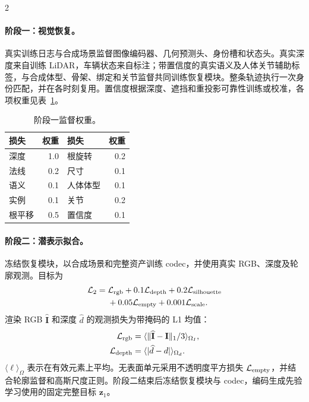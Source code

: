 \begin{multicols}{2}

\paragraph{阶段一：视觉恢复。}
真实训练日志与合成场景监督图像编码器、几何预测头、身份槽和状态头。真实深度来自训练 LiDAR，车辆状态来自标注；带置信度的真实语义及人体关节辅助标签，与合成体型、骨架、绑定和关节监督共同训练恢复模块。整条轨迹执行一次身份匹配，并在各时刻复用。置信度根据深度、遮挡和重投影可靠性训练或校准，各项权重见表~\ref{tab:recovery-weights}。

\begin{table}[H]
\centering\small
\caption{阶段一监督权重。}
\label{tab:recovery-weights}
\begin{tabular}{@{}lrlr@{}}
\toprule
损失 & 权重 & 损失 & 权重 \\
\midrule
深度 & 1.0 & 根旋转 & 0.2 \\
法线 & 0.2 & 尺寸 & 0.1 \\
语义 & 0.1 & 人体体型 & 0.1 \\
实例 & 0.1 & 关节 & 0.2 \\
根平移 & 0.5 & 置信度 & 0.1 \\
\bottomrule
\end{tabular}
\end{table}

\paragraph{阶段二：潜表示拟合。}
冻结恢复模块，以合成场景和完整资产训练 codec，并使用真实 RGB、深度及轮廓观测。目标为
\begin{align}
\mathcal L_2={}&\mathcal L_{\rm rgb}+0.1\mathcal L_{\rm depth}
+0.2\mathcal L_{\rm silhouette}\nonumber\\
&+0.05\mathcal L_{\rm empty}+0.001\mathcal L_{\rm scale}.
\label{eq:codec-loss}
\end{align}
渲染 RGB $\widehat{\mathbf I}$ 和深度 $\widehat d$ 的观测损失为带掩码的 L1 均值：
\begin{align}
\mathcal L_{\rm rgb}&=\langle\|\widehat{\mathbf I}-\mathbf I\|_1/3\rangle_{\Omega_I},\\
\mathcal L_{\rm depth}&=\langle|\widehat d-d|\rangle_{\Omega_d}.
\label{eq:reconstruction-loss}
\end{align}
$\langle\ell\rangle_\Omega$ 表示在有效元素上平均。无表面单元采用不透明度平方损失 $\mathcal L_{\rm empty}$，并结合轮廓监督和高斯尺度正则。阶段二结束后冻结恢复模块与 codec，编码生成先验学习使用的固定完整目标 $\mathbf z_1$。


\end{multicols}
